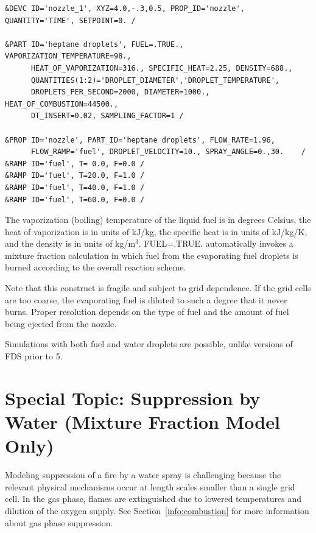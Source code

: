 \documentclass[11pt]{book}
\begin{document}
\footnotesize
\begin{verbatim}
&DEVC ID='nozzle_1', XYZ=4.0,-.3,0.5, PROP_ID='nozzle', QUANTITY='TIME', SETPOINT=0. /

&PART ID='heptane droplets', FUEL=.TRUE., VAPORIZATION_TEMPERATURE=98.,
      HEAT_OF_VAPORIZATION=316., SPECIFIC_HEAT=2.25, DENSITY=688.,
      QUANTITIES(1:2)='DROPLET_DIAMETER','DROPLET_TEMPERATURE',
      DROPLETS_PER_SECOND=2000, DIAMETER=1000., HEAT_OF_COMBUSTION=44500.,
      DT_INSERT=0.02, SAMPLING_FACTOR=1 /

&PROP ID='nozzle', PART_ID='heptane droplets', FLOW_RATE=1.96,
      FLOW_RAMP='fuel', DROPLET_VELOCITY=10., SPRAY_ANGLE=0.,30.    /
&RAMP ID='fuel', T= 0.0, F=0.0 /
&RAMP ID='fuel', T=20.0, F=1.0 /
&RAMP ID='fuel', T=40.0, F=1.0 /
&RAMP ID='fuel', T=60.0, F=0.0 /
\end{verbatim}
\normalsize

\noindent
The vaporization (boiling) temperature of
the liquid fuel is in degrees Celsius, the heat of vaporization
is in units of kJ/kg, the specific heat is in units of
kJ/kg/K, and the density is in units of kg/m$^3$.
{\ct FUEL=.TRUE.} automatically
invokes a mixture fraction calculation in which fuel
from the evaporating fuel droplets is burned according to the overall reaction scheme.

Note
that this construct is fragile and subject to grid
dependence. If the grid cells are too coarse, the
evaporating fuel is diluted to such a degree that it
never burns. Proper resolution depends on the type of
fuel and the amount of fuel being ejected from the
nozzle.

\begin{warning}
Simulations with both fuel and water droplets are possible, unlike versions of FDS prior to 5.
\end{warning}


\section{Special Topic: Suppression by Water (Mixture Fraction Model Only)}

Modeling suppression of a fire by a water spray is challenging because
the relevant physical mechanisms occur at length scales smaller than a
single grid cell. In the gas phase, flames are extinguished due to lowered
temperatures and dilution of the oxygen supply. See Section~\ref{info:combustion}
for more information about gas phase suppression.
\end{document}
